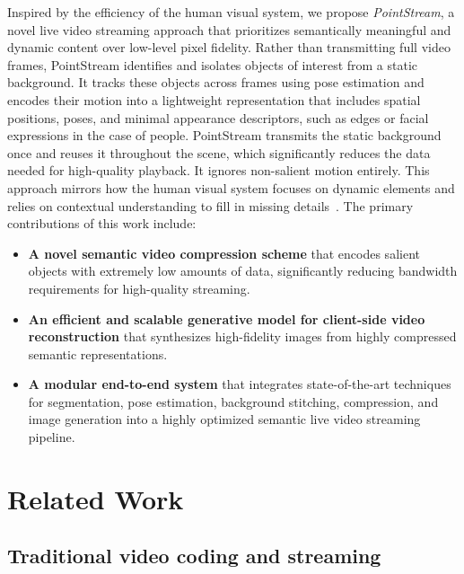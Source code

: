 \documentclass[manuscript, screen]{acmart}
\begin{document}
Inspired by the efficiency of the human visual system, we propose {\em PointStream}, a novel live video streaming approach that prioritizes semantically meaningful and dynamic content over low-level pixel fidelity.
Rather than transmitting full video frames, PointStream identifies and isolates objects of interest from a static background. It tracks these objects across frames using pose estimation and encodes their motion into a lightweight representation that includes spatial positions, poses, and minimal appearance descriptors, such as edges or facial expressions in the case of people. PointStream transmits the static background once and reuses it throughout the scene, which significantly reduces the data needed for high-quality playback. It ignores non-salient motion entirely. This approach mirrors how the human visual system focuses on dynamic elements and relies on contextual understanding to fill in missing details~\cite{wu2014guidance}.
The primary contributions of this work include:
\begin{itemize}[topsep=0pt,itemsep=0pt,leftmargin=*]
\item \textbf{A novel semantic video compression scheme} that encodes salient objects with extremely low amounts of data, significantly reducing bandwidth requirements for high-quality streaming.
\item \textbf{An efficient and scalable generative model for client-side video reconstruction} that synthesizes high-fidelity images from highly compressed semantic representations.
\item \textbf{A modular end-to-end system} that integrates state-of-the-art techniques for segmentation, pose estimation, background stitching, compression, and image generation into a highly optimized semantic live video streaming pipeline.
\end{itemize}

\section{Related Work}

\subsection{Traditional video coding and streaming}
\end{document}
